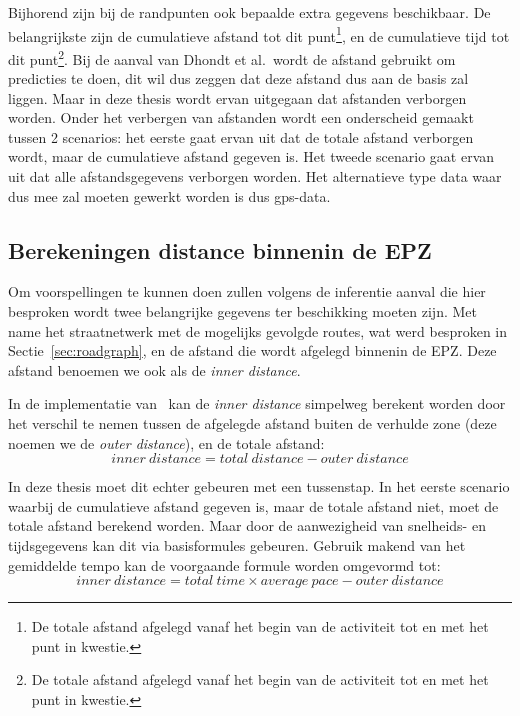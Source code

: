 Bijhorend zijn bij de randpunten ook bepaalde extra gegevens beschikbaar. De
belangrijkste zijn de cumulatieve afstand tot dit punt\footnote{De totale
    afstand afgelegd vanaf het begin van de activiteit tot en met het punt in
    kwestie.}, en de cumulatieve tijd tot dit punt\footnote{De totale afstand
    afgelegd vanaf het begin van de activiteit tot en met het punt in kwestie.}.
Bij de aanval van Dhondt et al.\ wordt de afstand gebruikt om predicties te
doen, dit wil dus zeggen dat deze afstand dus aan de basis zal liggen. Maar in
deze thesis wordt ervan uitgegaan dat afstanden verborgen worden. Onder het
verbergen van afstanden wordt een onderscheid gemaakt tussen 2 scenarios: het
eerste gaat ervan uit dat de totale afstand verborgen wordt, maar de
cumulatieve afstand gegeven is. Het tweede scenario gaat ervan uit dat alle
afstandsgegevens verborgen worden. Het alternatieve type data waar dus mee zal
moeten gewerkt worden is dus \ac{gps}-data.

\subsection{Berekeningen distance binnenin de EPZ}\label{sec:Berekeningen}
Om voorspellingen te kunnen doen zullen volgens de inferentie aanval die hier
besproken wordt twee belangrijke gegevens ter beschikking moeten zijn. Met name
het straatnetwerk met de mogelijks gevolgde routes, wat werd besproken in
Sectie~\ref{sec:roadgraph}, en de afstand die wordt afgelegd binnenin de
\ac{EPZ}. Deze afstand benoemen we ook als de \textit{inner distance}.

In de implementatie
van~\citeauthor{Dhondt_Pochat_Voulimeneas_Joosen_Volckaert_2022} kan de
\textit{inner distance} simpelweg berekent worden door het verschil te nemen
tussen de afgelegde afstand buiten de verhulde zone (deze noemen we de
\textit{outer distance}), en de totale afstand: \[inner\ distance = total\
    distance - outer\ distance \]

In deze thesis moet dit echter gebeuren met een tussenstap. In het eerste
scenario waarbij de cumulatieve afstand gegeven is, maar de totale afstand
niet, moet de totale afstand berekend worden. Maar door de aanwezigheid van
snelheids- en tijdsgegevens kan dit via basisformules gebeuren. Gebruik makend
van het gemiddelde tempo kan de voorgaande formule worden omgevormd tot: \[inner\ distance = total\ time \times average\ pace - outer\ distance \]


